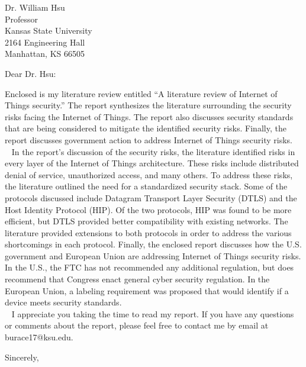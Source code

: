 \documentclass{letter}
\begin{document}
\begin{letter}{Dr. William Hsu \\ Professor \\ Kansas State University \\ 2164 Engineering Hall \\ Manhattan, KS 66505}
\opening{Dear Dr. Hsu:}

Enclosed is my literature review entitled ``A literature review of Internet of Things security.'' The report synthesizes the literature
surrounding the security risks facing the Internet of Things. The report also discusses security standards that are being considered to 
mitigate the identified security risks. Finally, the report discusses government action to address Internet of Things security risks.\\
~\newline
In the report's discussion of the security risks, the literature identified risks in every layer of the Internet of Things architecture. 
These risks include distributed denial of service, unauthorized access, and many others. To address these risks, the literature outlined the need
for a standardized security stack. Some of the protocols discussed include Datagram Transport Layer Security (DTLS) and the Host Identity Protocol (HIP).
Of the two protocols, HIP was found to be more efficient, but DTLS provided better compatibility with existing networks. The literature provided
extensions to both protocols in order to address the various shortcomings in each protocol. Finally, the enclosed report discusses how the U.S. government
and European Union are addressing Internet of Things security risks. In the U.S., the FTC has not recommended any additional regulation, but does recommend
that Congress enact general cyber security regulation. In the European Union, a labeling requirement was proposed that would identify if a device meets
security standards.\\
~\newline
I appreciate you taking the time to read my report. If you have any questions or comments about the report, please feel free to contact me by email at
burace17@ksu.edu. 

\closing{Sincerely,}

\end{letter}
\end{document}
